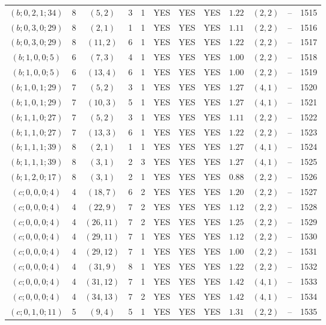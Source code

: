 \begin{longtable}{|c|c|c|c|c|c|c|c|c|c|c|c|}
$(b;0,2,1;34)$ & 8 & $(5,2)$ & 3 & 1 & YES & YES & YES & $1.22$ & $(2,2)$ & -- & 1515\\
$(b;0,3,0;29)$ & 8 & $(2,1)$ & 1 & 1 & YES & YES & YES & $1.11$ & $(2,2)$ & -- & 1516\\
$(b;0,3,0;29)$ & 8 & $(11,2)$ & 6 & 1 & YES & YES & YES & $1.22$ & $(2,2)$ & -- & 1517\\
$(b;1,0,0;5)$ & 6 & $(7,3)$ & 4 & 1 & YES & YES & YES & $1.00$ & $(2,2)$ & -- & 1518\\
$(b;1,0,0;5)$ & 6 & $(13,4)$ & 6 & 1 & YES & YES & YES & $1.00$ & $(2,2)$ & -- & 1519\\
$(b;1,0,1;29)$ & 7 & $(5,2)$ & 3 & 1 & YES & YES & YES & $1.27$ & $(4,1)$ & -- & 1520\\
$(b;1,0,1;29)$ & 7 & $(10,3)$ & 5 & 1 & YES & YES & YES & $1.27$ & $(4,1)$ & -- & 1521\\
$(b;1,1,0;27)$ & 7 & $(5,2)$ & 3 & 1 & YES & YES & YES & $1.11$ & $(2,2)$ & -- & 1522\\
$(b;1,1,0;27)$ & 7 & $(13,3)$ & 6 & 1 & YES & YES & YES & $1.22$ & $(2,2)$ & -- & 1523\\
$(b;1,1,1;39)$ & 8 & $(2,1)$ & 1 & 1 & YES & YES & YES & $1.27$ & $(4,1)$ & -- & 1524\\
$(b;1,1,1;39)$ & 8 & $(3,1)$ & 2 & 3 & YES & YES & YES & $1.27$ & $(4,1)$ & -- & 1525\\
$(b;1,2,0;17)$ & 8 & $(3,1)$ & 2 & 1 & YES & YES & YES & $0.88$ & $(2,2)$ & -- & 1526\\
$(c;0,0,0;4)$ & 4 & $(18,7)$ & 6 & 2 & YES & YES & YES & $1.20$ & $(2,2)$ & -- & 1527\\
$(c;0,0,0;4)$ & 4 & $(22,9)$ & 7 & 2 & YES & YES & YES & $1.12$ & $(2,2)$ & -- & 1528\\
$(c;0,0,0;4)$ & 4 & $(26,11)$ & 7 & 2 & YES & YES & YES & $1.25$ & $(2,2)$ & -- & 1529\\
$(c;0,0,0;4)$ & 4 & $(29,11)$ & 7 & 1 & YES & YES & YES & $1.12$ & $(2,2)$ & -- & 1530\\
$(c;0,0,0;4)$ & 4 & $(29,12)$ & 7 & 1 & YES & YES & YES & $1.00$ & $(2,2)$ & -- & 1531\\
$(c;0,0,0;4)$ & 4 & $(31,9)$ & 8 & 1 & YES & YES & YES & $1.22$ & $(2,2)$ & -- & 1532\\
$(c;0,0,0;4)$ & 4 & $(31,12)$ & 7 & 1 & YES & YES & YES & $1.42$ & $(4,1)$ & -- & 1533\\
$(c;0,0,0;4)$ & 4 & $(34,13)$ & 7 & 2 & YES & YES & YES & $1.42$ & $(4,1)$ & -- & 1534\\
$(c;0,1,0;11)$ & 5 & $(9,4)$ & 5 & 1 & YES & YES & YES & $1.31$ & $(2,2)$ & -- & 1535\\

\end{longtable}
